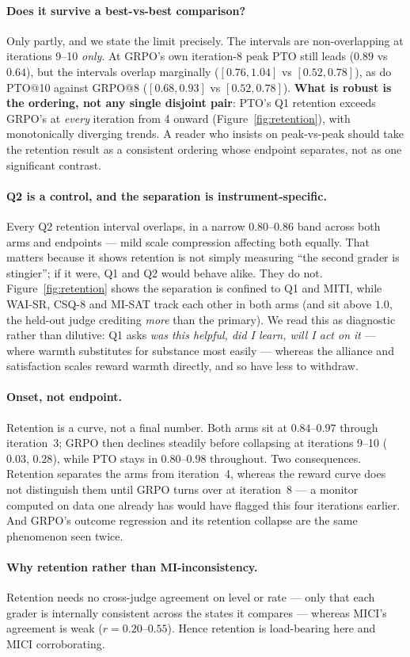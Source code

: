 \paragraph{Does it survive a best-vs-best comparison?} Only partly, and we state the limit
precisely. The intervals are non-overlapping at iterations 9--10 \emph{only}. At GRPO's own
iteration-8 peak PTO still leads ($0.89$ vs $0.64$), but the intervals overlap marginally
($[0.76,1.04]$ vs $[0.52,0.78]$), as do PTO@10 against GRPO@8 ($[0.68,0.93]$ vs $[0.52,0.78]$).
\textbf{What is robust is the ordering, not any single disjoint pair}: PTO's Q1 retention
exceeds GRPO's at \emph{every} iteration from 4 onward (Figure~\ref{fig:retention}), with
monotonically diverging trends. A reader who insists on peak-vs-peak should take the retention
result as a consistent ordering whose endpoint separates, not as one significant contrast.

\paragraph{Q2 is a control, and the separation is instrument-specific.} Every Q2 retention
interval overlaps, in a narrow $0.80$--$0.86$ band across both arms and endpoints --- mild scale
compression affecting both equally. That matters because it shows retention is not simply
measuring ``the second grader is stingier''; if it were, Q1 and Q2 would behave alike. They do
not. Figure~\ref{fig:retention} shows the separation is confined to Q1 and MITI, while WAI-SR,
CSQ-8 and MI-SAT track each other in both arms (and sit above $1.0$, the held-out judge crediting
\emph{more} than the primary). We read this as diagnostic rather than dilutive: Q1 asks
\emph{was this helpful, did I learn, will I act on it} --- where warmth substitutes for
substance most easily --- whereas the alliance and satisfaction scales reward warmth directly,
and so have less to withdraw.

\paragraph{Onset, not endpoint.} Retention is a curve, not a final number. Both arms sit at
$0.84$--$0.97$ through iteration~3; GRPO then declines steadily before collapsing at iterations
9--10 ($0.03$, $0.28$), while PTO stays in $0.80$--$0.98$ throughout. Two consequences.
Retention separates the arms from iteration~4, whereas the reward curve does not distinguish
them until GRPO turns over at iteration~8 --- a monitor computed on data one already has would
have flagged this four iterations earlier. And GRPO's outcome regression and its retention
collapse are the same phenomenon seen twice.

\paragraph{Why retention rather than MI-inconsistency.} Retention needs no cross-judge agreement
on level or rate --- only that each grader is internally consistent across the states it
compares --- whereas MICI's agreement is weak ($r=0.20$--$0.55$). Hence retention is
load-bearing here and MICI corroborating.
